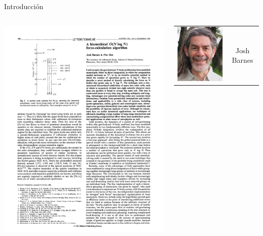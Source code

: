 \documentclass{beamer}
\begin{document}
\begin{frame}{Introducci\'on}
	\centering
	\begin{columns}
		\begin{column}{.5\textwidth}
			\includegraphics[height=0.8\textheight]{sources/images/barnes1986.pdf}
		\end{column}
		\begin{column}{.5\textwidth}
			\centering
			\begin{tabular}{cc}
				\includegraphics[height=0.3\textheight]{sources/images/barnes.jpg} & Josh Barnes\\

\end{tabular}
\end{column}
\end{columns}
\end{frame}
\end{document}
